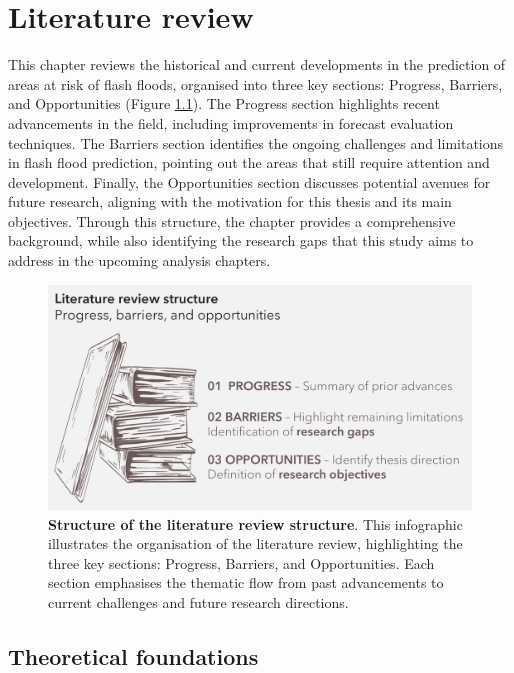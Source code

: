 \chapter{Literature review}
\label{literature_review}


This chapter reviews the historical and current developments in the prediction of areas at risk of flash floods, organised into three key sections: Progress, Barriers, and Opportunities (Figure \ref{fig:literature_structure}). The Progress section highlights recent advancements in the field, including improvements in forecast evaluation techniques. The Barriers section identifies the ongoing challenges and limitations in flash flood prediction, pointing out the areas that still require attention and development. Finally, the Opportunities section discusses potential avenues for future research, aligning with the motivation for this thesis and its main objectives. Through this structure, the chapter provides a comprehensive background, while also identifying the research gaps that this study aims to address in the upcoming analysis chapters.

\begin{figure}[htbp]
\centering
\includegraphics[scale=1.1]{Figures/Chapter_02/literature_structure.png}
\caption{\textbf{Structure of the literature review structure}. This infographic illustrates the organisation of the literature review, highlighting the three key sections: Progress, Barriers, and Opportunities. Each section emphasises the thematic flow from past advancements to current challenges and future research directions.}
\label{fig:literature_structure}
\end{figure}

\section{Theoretical foundations}

